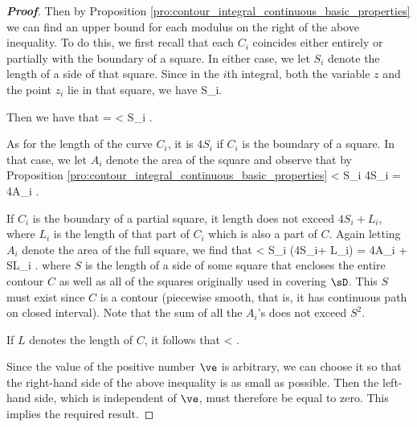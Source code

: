 \begin{proof}[\bf Proof]
Then by Proposition \ref{pro:contour_integral_continuous_basic_properties} we can find an upper bound for each modulus on the right of the above inequality. To do this, we first recall that each $C_i$ coincides either entirely or partially with the boundary of a square. In either case, we let $S_i$ denote the length of a side of that square. Since in the $i$th integral, both the variable $z$ and the point $z_i$ lie in that square, we have
\be
{} \leq {}S_i.
\ee

Then we have that
\be
{} =  < S_i \ve.
\ee

As for the length of the curve $C_i$, it is $4S_i$ if $C_i$ is the boundary of a square. In that case, we let $A_i$ denote the area of the square and observe that by  Proposition \ref{pro:contour_integral_continuous_basic_properties}
\be
{} < S_i \ve \cdot 4S_i = 4A_i \ve.
\ee

If $C_i$ is the boundary of a partial square, it length does not exceed $4S_i+ L_i$, where $L_i$ is the length of that part of $C_i$ which is also a part of $C$. Again letting $A_i$ denote the area of the full square, we find that
\be
{} < S_i \ve \cdot (4S_i+ L_i) = 4A_i \ve + SL_i \ve.
\ee
where $S$ is the length of a side of some square that encloses the entire contour $C$ as well as all of the squares originally used in covering $\sD$. This $S$ must exist since $C$ is a contour (piecewise smooth, that is, it has continuous path on closed interval). Note that the sum of all the $A_i$'s does not exceed $S^2$.

If $L$ denotes the length of $C$, it follows that
\be
{} < \ve.
\ee

Since the value of the positive number $\ve$ is arbitrary, we can choose it so that the right-hand side of the above inequality is as small as possible. Then the left-hand side, which is independent of $\ve$, must therefore be equal to zero. This implies the required result.
\end{proof}

